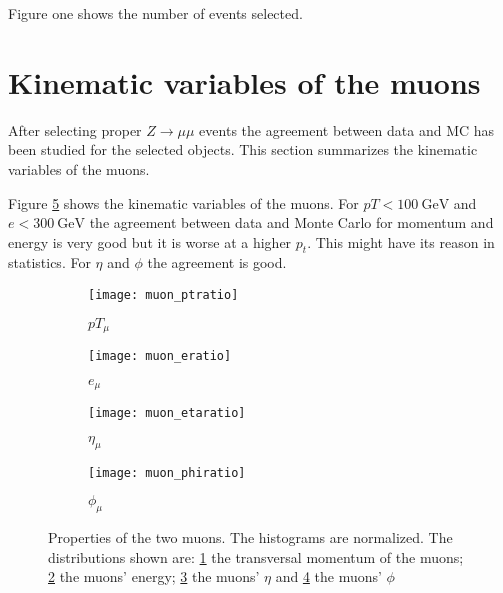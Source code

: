 Figure one shows the number of events selected. 

\section{Kinematic variables of the muons}

After selecting proper $Z \rightarrow \mu \mu$ events the agreement between data and MC has been studied for the selected objects. This section summarizes the kinematic variables of the muons.

Figure \ref{fig:muons} shows the kinematic variables of the muons. For $pT<\SI{100}{\GeV}$ and $e<\SI{300}{\GeV}$ the agreement between data and Monte Carlo for momentum and energy is very good but it is worse at a higher $p_t$. This might have its reason in statistics. For $\eta$ and $\phi$ the agreement is good.





\begin{figure}[h]
\centering
\begin{subfigure}[b]{0.5\figwidth}
\texttt{[image: muon\_ptratio]}
\caption[Transversal momentum of the muons]{$pT_{\mu}$}
\label{fig:muonpt}
\end{subfigure}
\quad
\begin{subfigure}[b]{0.5\figwidth}
\texttt{[image: muon\_eratio]}
\caption[Energy of the muons]{$e_{\mu}$}
\label{fig:muone}
\end{subfigure}


\begin{subfigure}[b]{0.5\figwidth}
\texttt{[image: muon\_etaratio]}
\caption[$\eta$ of the muons]{$\eta_{\mu}$}
\label{fig:muoneta}
\end{subfigure}
\quad
\begin{subfigure}[b]{0.5\figwidth}
\texttt{[image: muon\_phiratio]}
\caption[$\phi$ of the muons]{$\phi_{\mu}$}
\label{fig:muonphi}
\end{subfigure}
\caption{Properties of the two muons. The histograms are normalized. The distributions shown are: \ref{fig:muonpt} the transversal momentum of the muons; \ref{fig:muone} the muons' energy; \ref{fig:muoneta} the muons' $\eta$ and \ref{fig:muonphi} the muons' $\phi$}
\label{fig:muons}
\end{figure}



